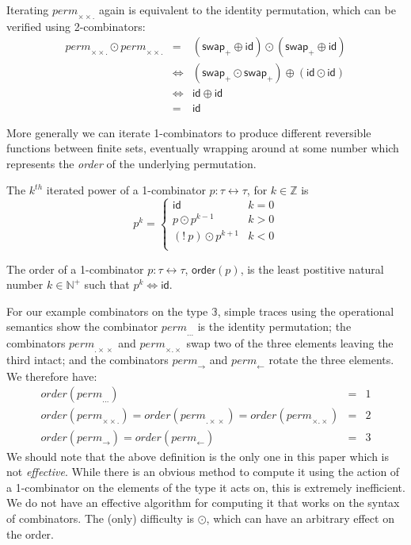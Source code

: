 \documentclass[a4paper,USenglish]{lipics-v2016-utf8x}
\newcommand{\iso}{\leftrightarrow}
\newcommand{\isotwo}{\Leftrightarrow}
\newcommand{\ord}[1]{\ensuremath{\mathsf{order}(#1)}}
\newcommand{\Z}{\mathbb{Z}}
\newcommand{\N}{\mathbb{N}}
\newcommand{\permone}{\mathit{perm}_{...}}
\newcommand{\permtwo}{\mathit{perm}_{\times\!\times.}}
\newcommand{\permthree}{\mathit{perm}_{.\times\!\times}}
\newcommand{\permfour}{\mathit{perm}_{\rightarrow}}
\newcommand{\permfive}{\mathit{perm}_{\leftarrow}}
\newcommand{\permsix}{\mathit{perm}_{\times.\times}}
\newcommand{\swapp}{\mathsf{{swap_+}}}
\newcommand{\idiso}{\mathsf{{id}}}
\begin{document}
Iterating $\permtwo$ again is equivalent to the identity permutation, which can
be verified using 2-combinators: \[\begin{array}{rcl} \permtwo \odot \permtwo
&=& (\swapp \oplus \idiso) \odot (\swapp \oplus \idiso) \\ &\isotwo& (\swapp
\odot \swapp) \oplus (\idiso \odot \idiso) \\ &\isotwo& \idiso \oplus \idiso \\
&=& \idiso \end{array}\]

More generally we can iterate 1-combinators to produce different
reversible functions between finite sets, eventually wrapping around
at some number which represents the \emph{order} of the underlying
permutation.

\begin{definition}
  The $k^{th}$ iterated power of a 1-combinator $p : \tau \iso \tau$, for
  $k \in \Z$ is
  \[
    p^k =
  \begin{cases}
    \idiso & k = 0 \\
    p \odot p^{k - 1} & k > 0 \\
    (!~p) \odot p^{k + 1} & k < 0 \\
  \end{cases}
  \]
\end{definition}

\begin{definition}
\label{def:order}
  The order of a 1-combinator $p : \tau \iso \tau$, $\ord{p}$, is the
  least postitive natural number $k \in \N^+$ such that
  $p^k \isotwo \idiso$.
\end{definition}

For our example combinators on the type $\mathbb{3}$, simple traces using the
operational semantics show the combinator $\permone$ is the identity
permutation; the combinators $\permthree$ and $\permsix$ swap two of the three
elements leaving the third intact; and the combinators $\permfour$ and
$\permfive$ rotate the three elements. We therefore have:
\[\begin{array}{rcl}
\mathit{order}(\permone) &=& 1 \\
\mathit{order}(\permtwo) = \mathit{order}(\permthree) = \mathit{order}(\permsix) &=& 2 \\
\mathit{order}(\permfour) = \mathit{order}(\permfive) &=& 3
\end{array}\]
We should note that the above definition is the only one in this paper which is not \emph{effective}. While there is an obvious method to compute it using the action of a 1-combinator on the elements of the type it acts on, this is extremely inefficient. We do not have an effective algorithm for computing it that works on the syntax of combinators.  The (only) difficulty is $\odot$, which can have an arbitrary effect on the order.
\end{document}
